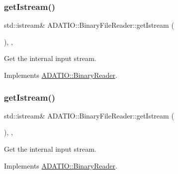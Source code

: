 \subsubsection{\texorpdfstring{getIstream()}{getIstream()}\hspace{0.1cm}{\footnotesize\ttfamily [1/2]}}
{\footnotesize\ttfamily std\+::istream\& A\+D\+A\+T\+I\+O\+::\+Binary\+File\+Reader\+::get\+Istream (\begin{DoxyParamCaption}{ }\end{DoxyParamCaption})\hspace{0.3cm}{\ttfamily [inline]}, {\ttfamily [protected]}, {\ttfamily [virtual]}}



Get the internal input stream. 



Implements \mbox{\hyperlink{classADATIO_1_1BinaryReader_aa34e73d5f1e6b2b3b48c27e97f6a85a0}{A\+D\+A\+T\+I\+O\+::\+Binary\+Reader}}.

\mbox{\label{classADATIO_1_1BinaryFileReader_ae0985a1157f9baa87580606cfcf98908}} 
\subsubsection{\texorpdfstring{getIstream()}{getIstream()}\hspace{0.1cm}{\footnotesize\ttfamily [2/2]}}
{\footnotesize\ttfamily std\+::istream\& A\+D\+A\+T\+I\+O\+::\+Binary\+File\+Reader\+::get\+Istream (\begin{DoxyParamCaption}{ }\end{DoxyParamCaption})\hspace{0.3cm}{\ttfamily [inline]}, {\ttfamily [protected]}, {\ttfamily [virtual]}}



Get the internal input stream. 



Implements \mbox{\hyperlink{classADATIO_1_1BinaryReader_aa34e73d5f1e6b2b3b48c27e97f6a85a0}{A\+D\+A\+T\+I\+O\+::\+Binary\+Reader}}.

\mbox{\label{classADATIO_1_1BinaryFileReader_a679fa9d101de2993355f4dd193d4f64d}} 
